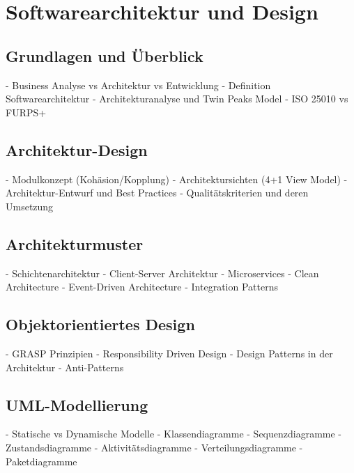 \section{Softwarearchitektur und Design}

\subsection{Grundlagen und Überblick}
- Business Analyse vs Architektur vs Entwicklung  
- Definition Softwarearchitektur
- Architekturanalyse und Twin Peaks Model
- ISO 25010 vs FURPS+

\subsection{Architektur-Design}
- Modulkonzept (Kohäsion/Kopplung)
- Architektursichten (4+1 View Model)
- Architektur-Entwurf und Best Practices
- Qualitätskriterien und deren Umsetzung

\subsection{Architekturmuster}
- Schichtenarchitektur
- Client-Server Architektur 
- Microservices
- Clean Architecture
- Event-Driven Architecture
- Integration Patterns

\subsection{Objektorientiertes Design}
- GRASP Prinzipien
- Responsibility Driven Design
- Design Patterns in der Architektur
- Anti-Patterns

\subsection{UML-Modellierung}
- Statische vs Dynamische Modelle
- Klassendiagramme
- Sequenzdiagramme
- Zustandsdiagramme  
- Aktivitätsdiagramme
- Verteilungsdiagramme
- Paketdiagramme

